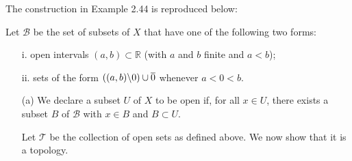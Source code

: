 
\begin{solution}
    The construction in Example 2.44 is reproduced
            below:

            \vspace*{2mm}
            Let $\mathscr{B}$ be the set of subsets of $X$
            that have one of the following two forms:
        \begin{enumerate}
            \item[i.] open intervals $(a, b)
                \subset \mathbb{R}$ (with $a$ and $b$
                finite and $a < b$);
            \item[ii.] sets of the form $((a, b)
                \char`\\{0})\cup {\overline{0}}$
                whenever $a < 0 < b$.
        \end{enumerate}
    \begin{enumerate}
    \item[(a)] We declare a subset $U$ of $X$ to be open
        if, for all $x\in U$, there exists a
        subset $B$ of $\mathscr{B}$ with $x \in B$
        and $B \subset U$.

        \vspace*{2mm}
        Let $\mathscr{T}$ be the collection of open sets
        as defined above. We now show that it is a topology.


\end{enumerate}
\end{solution}
